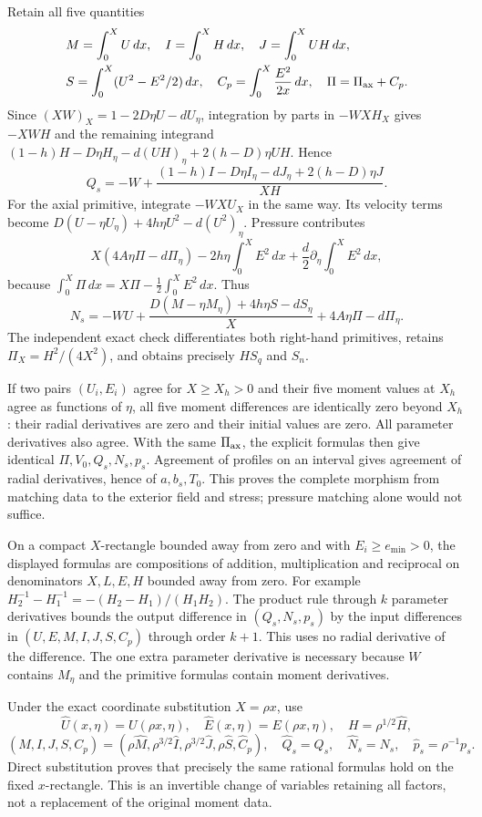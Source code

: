 \documentclass[10pt,a4paper]{article}
\begin{document}
Retain all five quantities
\[
\begin{aligned}
&M=\int_0^XU\,dx,\quad I=\int_0^XH\,dx,\quad J=\int_0^XUH\,dx,\\
&S=\int_0^X(U^2-E^2/2)\,dx,\quad C_p=\int_0^X\frac{E^2}{2x}\,dx,\quad \Pi=\Pi_{\rm ax}+C_p.
\end{aligned}
\]
Since \((XW)_X=1-2D\eta U-dU_\eta\), integration by parts in \(-WXH_X\) gives \(-XWH\) and the remaining integrand
\((1-h)H-D\eta H_\eta-d(UH)_\eta+2(h-D)\eta UH\). Hence
\[
Q_s=-W+\frac{(1-h)I-D\eta I_\eta-dJ_\eta+2(h-D)\eta J}{XH}.
\]
For the axial primitive, integrate \(-WXU_X\) in the same way. Its velocity terms become
\(D(U-\eta U_\eta)+4h\eta U^2-d(U^2)_\eta\). Pressure contributes
\[
X(4A\eta\Pi-d\Pi_\eta)-2h\eta\int_0^XE^2\,dx
+\frac d2\partial_\eta\int_0^XE^2\,dx,
\]
because \(\int_0^X\Pi\,dx=X\Pi-\frac12\int_0^XE^2\,dx\). Thus
\[
N_s=-WU+\frac{D(M-\eta M_\eta)+4h\eta S-dS_\eta}{X}
+4A\eta\Pi-d\Pi_\eta.
\]
The independent exact check differentiates both right-hand primitives, retains \(\Pi_X=H^2/(4X^2)\), and obtains precisely \(HS_q\) and \(S_n\).

If two pairs \((U_i,E_i)\) agree for \(X\ge X_h>0\) and their five moment values at \(X_h\) agree as functions of \(\eta\), all five moment differences are identically zero beyond \(X_h\): their radial derivatives are zero and their initial values are zero. All parameter derivatives also agree. With the same \(\Pi_{\rm ax}\), the explicit formulas then give identical \(\Pi,V_0,Q_s,N_s,p_s\). Agreement of profiles on an interval gives agreement of radial derivatives, hence of \(a,b_s,T_0\). This proves the complete morphism from matching data to the exterior field and stress; pressure matching alone would not suffice.

On a compact \(X\)-rectangle bounded away from zero and with \(E_i\ge e_{\min}>0\), the displayed formulas are compositions of addition, multiplication and reciprocal on denominators \(X,L,E,H\) bounded away from zero. For example
\(H_2^{-1}-H_1^{-1}=-(H_2-H_1)/(H_1H_2)\). The product rule through \(k\) parameter derivatives bounds the output difference in \((Q_s,N_s,p_s)\) by the input differences in \((U,E,M,I,J,S,C_p)\) through order \(k+1\). This uses no radial derivative of the difference. The one extra parameter derivative is necessary because \(W\) contains \(M_\eta\) and the primitive formulas contain moment derivatives.

Under the exact coordinate substitution \(X=\rho x\), use
\[
\widehat U(x,\eta)=U(\rho x,\eta),\quad\widehat E(x,\eta)=E(\rho x,\eta),
\quad H=\rho^{1/2}\widehat H,
\]
\[
(M,I,J,S,C_p)=(\rho\widehat M,\rho^{3/2}\widehat I,
\rho^{3/2}\widehat J,\rho\widehat S,\widehat C_p),
\quad\widehat Q_s=Q_s,\quad\widehat N_s=N_s,\quad\widehat p_s=\rho^{-1}p_s.
\]
Direct substitution proves that precisely the same rational formulas hold on the fixed \(x\)-rectangle. This is an invertible change of variables retaining all factors, not a replacement of the original moment data.
\end{document}
